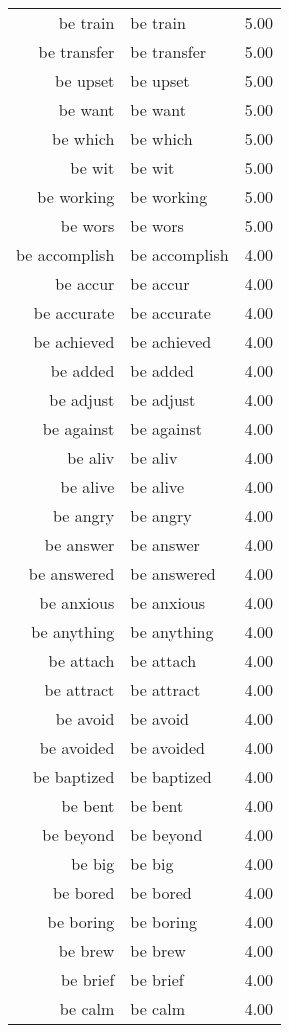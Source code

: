\begin{table}[ht]
\begin{tabular}{rlr}
  be train & be train & 5.00 \\ 
  be transfer & be transfer & 5.00 \\ 
  be upset & be upset & 5.00 \\ 
  be want & be want & 5.00 \\ 
  be which & be which & 5.00 \\ 
  be wit & be wit & 5.00 \\ 
  be working & be working & 5.00 \\ 
  be wors & be wors & 5.00 \\ 
  be accomplish & be accomplish & 4.00 \\ 
  be accur & be accur & 4.00 \\ 
  be accurate & be accurate & 4.00 \\ 
  be achieved & be achieved & 4.00 \\ 
  be added & be added & 4.00 \\ 
  be adjust & be adjust & 4.00 \\ 
  be against & be against & 4.00 \\ 
  be aliv & be aliv & 4.00 \\ 
  be alive & be alive & 4.00 \\ 
  be angry & be angry & 4.00 \\ 
  be answer & be answer & 4.00 \\ 
  be answered & be answered & 4.00 \\ 
  be anxious & be anxious & 4.00 \\ 
  be anything & be anything & 4.00 \\ 
  be attach & be attach & 4.00 \\ 
  be attract & be attract & 4.00 \\ 
  be avoid & be avoid & 4.00 \\ 
  be avoided & be avoided & 4.00 \\ 
  be baptized & be baptized & 4.00 \\ 
  be bent & be bent & 4.00 \\ 
  be beyond & be beyond & 4.00 \\ 
  be big & be big & 4.00 \\ 
  be bored & be bored & 4.00 \\ 
  be boring & be boring & 4.00 \\ 
  be brew & be brew & 4.00 \\ 
  be brief & be brief & 4.00 \\ 
  be calm & be calm & 4.00 \\ 

\end{tabular}
\end{table}
